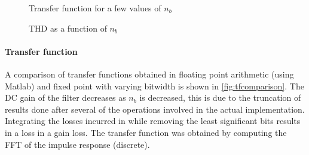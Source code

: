 \begin{figure}[htbp]
	\centering
	\caption{Transfer function for a few values of $n_b$}
	\label{fig:tfcomparison}
\end{figure}
\begin{figure}[htbp]
	\centering
	\caption{THD as a function of $n_b$}
	\label{fig:thdplot}
\end{figure}

\paragraph{Transfer function} A comparison of transfer functions obtained in floating point arithmetic (using Matlab) and fixed point with varying bitwidth is shown in \autoref{fig:tfcomparison}. The DC gain of the filter decreases as $n_b$ is decreased, this is due to the truncation of results done after several of the operations involved in the actual implementation. Integrating the losses incurred in while removing the least significant bits results in a loss in a gain loss. The transfer function was obtained by computing the FFT of the impulse response (discrete).
